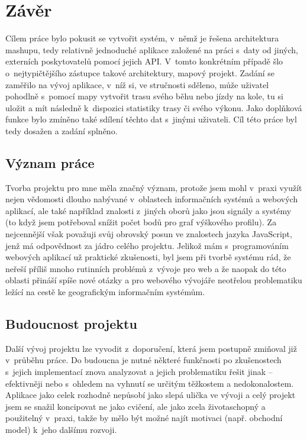 \chapter*{Závěr}
Cílem práce bylo pokusit se vytvořit systém, v~němž je řešena
architektura mashupu, tedy relativně jednoduché aplikace založené na
práci s~daty od jiných, externích poskytovatelů pomocí jejich API.
V~tomto konkrétním případě šlo o~nej\-typičtějšího zástupce takové
architektury, mapový projekt. Zadání se zaměřilo na vývoj aplikace,
v~níž si, ve stručnosti sděleno, může uživatel pohodlně s~pomocí mapy
vytvořit trasu svého běhu nebo jízdy na kole, tu si uložit a mít
následně k~dispozici statistiky trasy či svého výkonu. Jako doplňková
funkce bylo zmíněno také sdílení těchto dat s~jinými uživateli. Cíl
této práce byl tedy dosažen a zadání splněno.

\section*{Význam práce}
Tvorba projektu pro mne měla značný význam, protože jsem
mohl v~praxi využít nejen vědomosti dlouho nabývané v~oblastech informačních systémů a webových
aplikací, ale také například znalosti z~jiných oborů jako jsou
signály a systémy (to když jsem potřeboval snížit počet bodů pro graf
výškového profilu). Za nej\-cennější však považuji svůj obrovský posun
ve znalostech jazyka JavaScript, jenž má odpovědnost za jádro celého
projektu. Jelikož mám s~programováním webových aplikací už praktické
zkušenosti, byl jsem při tvorbě systému rád, že neřeší příliš mnoho
rutinních problémů z~vývoje pro web a že naopak do této oblasti
přináší spíše nové otázky a pro webového vývojáře neotřelou
problematiku ležící na cestě ke geografickým informačním systémům.

\section*{Budoucnost projektu}
Další vývoj projektu lze vyvodit z~doporučení, která jsem
postupně zmiňoval již v~průběhu práce. Do budoucna je
nutné některé funkčnosti po zkušenostech s~jejich implementací znova
analyzovat a jejich problematiku řešit jinak -- efektivněji nebo
s~ohledem na vyhnutí se určitým těžkostem a nedokonalostem. Aplikace
jako celek rozhodně nepůsobí jako slepá ulička ve vývoji a celý
projekt jsem se snažil koncipovat ne jako cvičení, ale jako
zcela životaschopný a použitelný v~praxi, takže by mělo být
možné najít motivaci (např. obchodní model) k~jeho dalšímu rozvoji.

